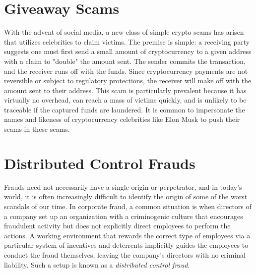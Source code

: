 \section{Giveaway Scams}

With the advent of social media, a new class of simple crypto scams has arisen
that utilizes celebrities to claim victims. The premise is simple: a receiving
party suggests one must first send a small amount of cryptocurrency to a given
address with a claim to "double" the amount sent. The sender commits the
transaction, and the receiver runs off with the funds. Since cryptocurrency
payments are not reversible or subject to regulatory protections, the receiver
will make off with the amount sent to their address. This scam is particularly
prevalent because it has virtually no overhead, can reach a mass of victims
quickly, and is unlikely to be traceable if the captured funds are laundered. It
is common to impersonate the names and likeness of cryptocurrency celebrities
like Elon Musk to push their scams in these scams.


\section{Distributed Control Frauds}

Frauds need not necessarily have a single origin or perpetrator, and in today's
world, it is often increasingly difficult to identify the origin of some of the
worst scandals of our time. In corporate fraud, a common situation is when
directors of a company set up an organization with a criminogenic culture that
encourages fraudulent activity but does not explicitly direct employees to
perform the actions. A working environment that rewards the correct type of
employees via a particular system of incentives and deterrents implicitly guides
the employees to conduct the fraud themselves, leaving the company's directors
with no criminal liability. Such a setup is known as a \textit{distributed
control fraud}. \cite{davies_lying_2018}


